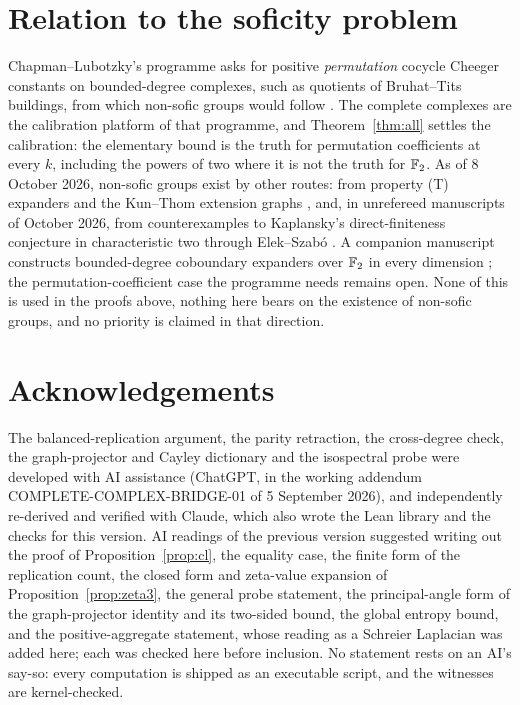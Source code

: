 \documentclass[11pt]{article}
\theoremstyle{remark}\newtheorem{remark}[theorem]{Remark}
\begin{document}
\section{Relation to the soficity problem}
Chapman--Lubotzky's programme asks for positive \emph{permutation} cocycle Cheeger constants on bounded-degree complexes, such as quotients of Bruhat--Tits buildings, from which non-sofic groups would follow \cite[Section~6.1]{CL2}. The complete complexes are the calibration platform of that programme, and Theorem~\ref{thm:all} settles the calibration: the elementary bound is the truth for permutation coefficients at every $k$, including the powers of two where it is not the truth for $\mathbb{F}_2$. As of 8 October 2026, non-sofic groups exist by other routes: from property (T) expanders and the Kun--Thom extension graphs \cite{Astra,FF,KT,AT}, and, in unrefereed manuscripts of October 2026, from counterexamples to Kaplansky's direct-finiteness conjecture in characteristic two \cite{OAIkap1,OAIkap2} through Elek--Szab\'o \cite{ES}. A companion manuscript constructs bounded-degree coboundary expanders over $\mathbb{F}_2$ in every dimension \cite{OAIexp}; the permutation-coefficient case the programme needs remains open. None of this is used in the proofs above, nothing here bears on the existence of non-sofic groups, and no priority is claimed in that direction.

\section*{Acknowledgements}
The balanced-replication argument, the parity retraction, the cross-degree check, the graph-projector and Cayley dictionary and the isospectral probe were developed with AI assistance (ChatGPT, in the working addendum COMPLETE-COMPLEX-BRIDGE-01 of 5 September 2026), and independently re-derived and verified with Claude, which also wrote the Lean library and the checks for this version. AI readings of the previous version suggested writing out the proof of Proposition~\ref{prop:cl}, the equality case, the finite form of the replication count, the closed form and zeta-value expansion of Proposition~\ref{prop:zeta3}, the general probe statement, the principal-angle form of the graph-projector identity and its two-sided bound, the global entropy bound, and the positive-aggregate statement, whose reading as a Schreier Laplacian was added here; each was checked here before inclusion. No statement rests on an AI's say-so: every computation is shipped as an executable script, and the witnesses are kernel-checked.
\end{document}
